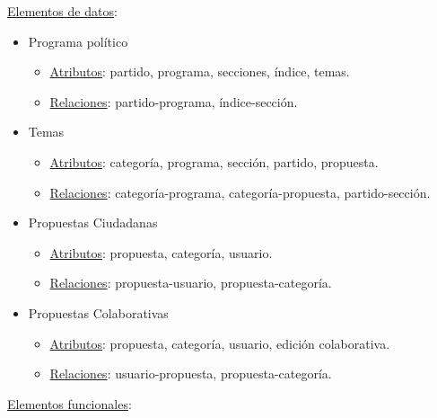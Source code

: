 \underline{Elementos de datos}:

\begin{itemize}
 \item Programa político
 \begin{itemize}
  \item \underline{Atributos}: partido, programa, secciones, índice, temas.
  \item \underline{Relaciones}: partido-programa, índice-sección.
 \end{itemize}
\end{itemize}

\begin{itemize}
 \item Temas
 \begin{itemize}
  \item \underline{Atributos}: categoría, programa, sección, partido, propuesta.
  \item \underline{Relaciones}: categoría-programa, categoría-propuesta, partido-sección.
 \end{itemize}
\end{itemize}

\begin{itemize}
 \item Propuestas Ciudadanas
 \begin{itemize}
  \item \underline{Atributos}: propuesta, categoría, usuario.
  \item \underline{Relaciones}: propuesta-usuario, propuesta-categoría.
 \end{itemize}
\end{itemize}

\begin{itemize}
 \item Propuestas Colaborativas
 \begin{itemize}
  \item \underline{Atributos}: propuesta, categoría, usuario, edición colaborativa.
  \item \underline{Relaciones}:  usuario-propuesta, propuesta-categoría.
 \end{itemize}
\end{itemize}

\underline{Elementos funcionales}:

